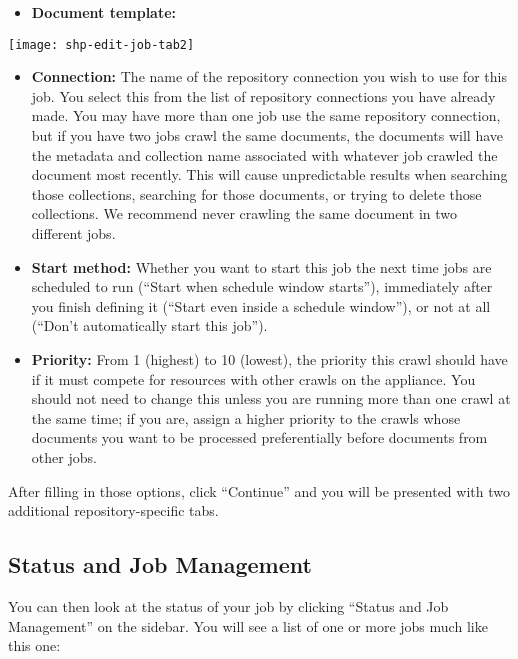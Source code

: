 \begin{changemargin}{1.5in}{0in}
\begin{itemize}
\item \textbf{Document template:} 

\end{itemize}

\texttt{[image: shp-edit-job-tab2]}

\begin{itemize}

\item \textbf{Connection:} The name of the repository connection you
wish to use for this job. You select this from the list of repository
connections you have already made. You may have more than one job use
the same repository connection, but if you have two jobs crawl the same
documents, the documents will have the metadata and collection name
associated with whatever job crawled the document most recently. This
will cause unpredictable results when searching those collections,
searching for those documents, or trying to delete those collections.
We recommend never crawling the same document in two different jobs.

\item \textbf{Start method:} Whether you want to start this job the next
time jobs are scheduled to run (``Start when schedule window starts''),
immediately after you finish defining it (``Start even inside a schedule
window''), or not at all (``Don't automatically start this job'').

\item \textbf{Priority:} From 1 (highest) to 10 (lowest), the priority
this crawl should have if it must compete for resources with other
crawls on the appliance. You should not need to change this unless you
are running more than one crawl at the same time; if you are, assign a
higher priority to the crawls whose documents you want to be processed
preferentially before documents from other jobs.

\end{itemize}

After filling in those options, click ``Continue'' and you will be
presented with two additional repository-specific tabs.



\subsection{\label{ManageJobs}Status and Job Management}

You can then look at the status of your job by clicking ``Status and 
Job Management'' on the sidebar. You will see a list of one or more jobs
much like this one:


\end{changemargin}
